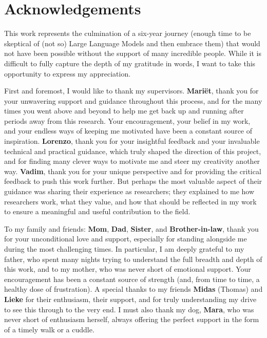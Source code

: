 \chapter*{Acknowledgements}\label{chap:personal}
This work represents the culmination of a six-year journey (enough time to be skeptical of (not so) Large Language Models and then embrace them) that would not have been possible without the support of many incredible people. While it is difficult to fully capture the depth of my gratitude in words, I want to take this opportunity to express my appreciation.

First and foremost, I would like to thank my supervisors. \textbf{Mariët}, thank you for your unwavering support and guidance throughout this process, and for the many times you went above and beyond to help me get back up and running after periods away from this research. Your encouragement, your belief in my work, and your endless ways of keeping me motivated have been a constant source of inspiration. \textbf{Lorenzo}, thank you for your insightful feedback and your invaluable technical and practical guidance, which truly shaped the direction of this project, and for finding many clever ways to motivate me and steer my creativity another way. \textbf{Vadim}, thank you for your unique perspective and for providing the critical feedback to push this work further. But perhaps the most valuable aspect of their guidance was sharing their experience as researchers; they explained to me how researchers work, what they value, and how that should be reflected in my work to ensure a meaningful and useful contribution to the field.

To my family and friends: \textbf{Mom}, \textbf{Dad}, \textbf{Sister}, and \textbf{Brother-in-law}, thank you for your unconditional love and support, especially for standing alongside me during the most challenging times. In particular, I am deeply grateful to my father, who spent many nights trying to understand the full breadth and depth of this work, and to my mother, who was never short of emotional support. Your encouragement has been a constant source of strength (and, from time to time, a healthy dose of frustration). A special thanks to my friends \textbf{Midas} (Thomas) and \textbf{Lieke} for their enthusiasm, their support, and for truly understanding my drive to see this through to the very end. I must also thank my dog, \textbf{Mara}, who was never short of enthusiasm herself, always offering the perfect support in the form of a timely walk or a cuddle.

